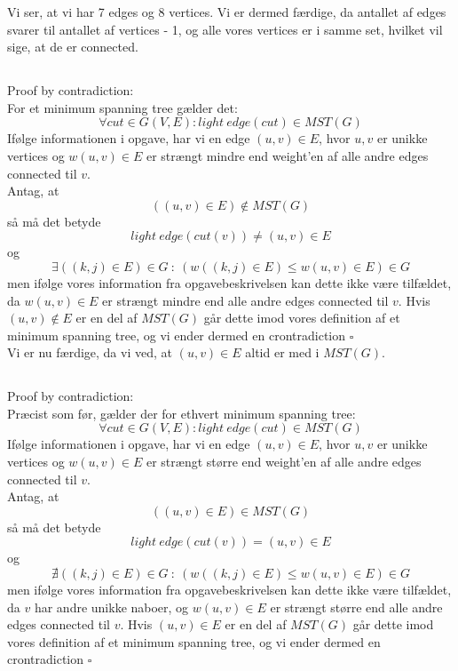 \documentclass[a4paper,12pt]{article}
\begin{document}
Vi ser, at vi har 7 edges og 8 vertices. Vi er dermed færdige, da antallet af edges svarer til antallet af vertices - 1, og alle vores vertices er i samme set, hvilket vil sige, at de er connected.


\subsection[]{}

Proof by contradiction:\\
For et minimum spanning tree gælder det:
\[\forall cut\in G(V,E): light \ edge(cut) \in MST(G)\]
Ifølge informationen i opgave, har vi en edge $(u,v) \in E$, hvor $u, v$ er unikke vertices og $w(u,v)\in E $ er strængt mindre end weight'en af alle andre edges connected til $v$.\\
Antag, at 
\[((u,v)\in E ) \notin MST(G)\]
så må det betyde 
\[light \ edge(cut(v)) \ne (u,v)\in E\]
og
\[\exists ((k,j) \in E)\in G \ : \ (w((k,j) \in E) \leq w(u,v)\in E)\in G\]
men ifølge vores information fra opgavebeskrivelsen kan dette ikke være tilfældet, da $w(u,v)\in E$ er strængt mindre end alle andre edges connected til $v$. Hvis $(u,v)\notin E$ er en del af $MST(G)$ går dette imod vores definition af et minimum spanning tree, og vi ender dermed en crontradiction $\square$\\

Vi er nu færdige, da vi ved, at $(u,v)\in E$ altid er med i $MST(G)$.


\subsection[]{}

Proof by contradiction:\\
Præcist som før, gælder der for ethvert minimum spanning tree:
\[\forall cut\in G(V,E): light \ edge(cut) \in MST(G)\]
Ifølge informationen i opgave, har vi en edge $(u,v) \in E$, hvor $u, v$ er unikke vertices og $w(u,v)\in E $ er strængt større end weight'en af alle andre edges connected til $v$.\\
Antag, at 
\[((u,v)\in E ) \in MST(G)\]
så må det betyde 
\[light \ edge(cut(v)) = (u,v)\in E\]
og
\[\nexists ((k,j) \in E)\in G \ : \ (w((k,j) \in E) \leq w(u,v)\in E)\in G\]
men ifølge vores information fra opgavebeskrivelsen kan dette ikke være tilfældet, da $v$ har andre unikke naboer, og $w(u,v)\in E$ er strængt større end alle andre edges connected til $v$. Hvis $(u,v)\in E$ er en del af $MST(G)$ går dette imod vores definition af et minimum spanning tree, og vi ender dermed en crontradiction $\square$\\
\end{document}
